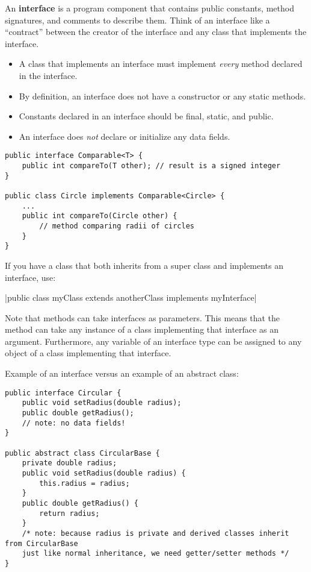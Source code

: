 \documentclass{article}
\newcommand{\nline}{\vspace{\baselineskip}}
\begin{document}
\begin{flushleft}
An \textbf{interface} is a program component that contains public constants, method signatures, and comments to describe them. Think of an interface like a ``contract'' between the creator of the interface and any class that implements the interface.

\begin{itemize}
    \item A class that implements an interface must implement \textit{every} method declared in the interface.
    \item By definition, an interface does not have a constructor or any static methods.
    \item Constants declared in an interface should be final, static, and public.
    \item An interface does \textit{not} declare or initialize any data fields.
\end{itemize}

\begin{verbatim}
public interface Comparable<T> {
    public int compareTo(T other); // result is a signed integer
}

public class Circle implements Comparable<Circle> {
    ...
    public int compareTo(Circle other) {
        // method comparing radii of circles
    }
}
\end{verbatim}

If you have a class that both inherits from a super class and implements an interface, use:

|public class myClass extends anotherClass implements myInterface|

Note that methods can take interfaces as parameters. This means that the method can take any instance of a class implementing that interface as an argument. Furthermore, any variable of an interface type can be assigned to any object of a class implementing that interface.

\nline

Example of an interface versus an example of an abstract class:

\begin{verbatim}
public interface Circular {
    public void setRadius(double radius);
    public double getRadius();
    // note: no data fields!
}

public abstract class CircularBase {
    private double radius;
    public void setRadius(double radius) {
        this.radius = radius;
    }
    public double getRadius() {
        return radius;
    }
    /* note: because radius is private and derived classes inherit from CircularBase 
    just like normal inheritance, we need getter/setter methods */
}
\end{verbatim}


\end{flushleft}
\end{document}
